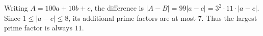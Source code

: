 Writing $A=100a+10b+c$, the difference is $|A-B|=99|a-c|=3^2\cdot11\cdot|a-c|$. Since $1\le|a-c|\le8$, its additional prime factors are at most $7$. Thus the largest prime factor is always $\boxed{11}$.

